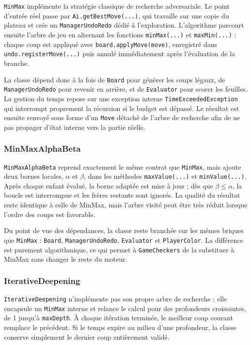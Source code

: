 \documentclass[a4paper]{article}
\begin{document}
\texttt{MinMax} implémente la stratégie classique de recherche adversariale. Le point d'entrée réel passe par \texttt{Ai.getBestMove(...)}, qui travaille sur une copie du plateau et crée un \texttt{ManagerUndoRedo} dédié à l'exploration. L'algorithme parcourt ensuite l'arbre de jeu en alternant les fonctions \texttt{minMax(...)} et \texttt{maxMin(...)} : chaque coup est appliqué avec \texttt{board.applyMove(move)}, enregistré dans \texttt{undo.registerMove(...)} puis annulé immédiatement après l'évaluation de la branche.

La classe dépend donc à la fois de \texttt{Board} pour générer les coups légaux, de \texttt{ManagerUndoRedo} pour revenir en arrière, et de \texttt{Evaluator} pour scorer les feuilles. La gestion du temps repose sur une exception interne \texttt{TimeExceededException} qui interrompt proprement la récursion si le budget est dépassé. Le résultat est ensuite renvoyé sous forme d'un \texttt{Move} détaché de l'arbre de recherche afin de ne pas propager d'état interne vers la partie réelle.

\subsubsection{MinMaxAlphaBeta}

\texttt{MinMaxAlphaBeta} reprend exactement le même contrat que \texttt{MinMax}, mais ajoute deux bornes locales, \(\alpha\) et \(\beta\), dans les méthodes \texttt{maxValue(...)} et \texttt{minValue(...)}. Après chaque enfant évalué, la borne adaptée est mise à jour ; dès que \(\beta \leq \alpha\), la boucle est interrompue et les frères restants sont ignorés. La qualité du résultat reste identique à celle de MinMax, mais l'arbre visité peut être très réduit lorsque l'ordre des coups est favorable.

Du point de vue des dépendances, la classe reste branchée sur les mêmes briques que \texttt{MinMax} : \texttt{Board}, \texttt{ManagerUndoRedo}, \texttt{Evaluator} et \texttt{PlayerColor}. La différence est purement algorithmique, ce qui permet à \texttt{GameCheckers} de la substituer à MinMax sans changer le reste du moteur.

\subsubsection{IterativeDeepening}

\texttt{IterativeDeepening} n'implémente pas son propre arbre de recherche ; elle encapsule un \texttt{MinMax} interne et relance le calcul pour des profondeurs croissantes, de 1 jusqu'à \texttt{maxDepth}. À chaque itération terminée, le meilleur coup courant remplace le précédent. Si le temps expire au milieu d'une profondeur, la classe conserve simplement le dernier coup entièrement validé.
\end{document}
